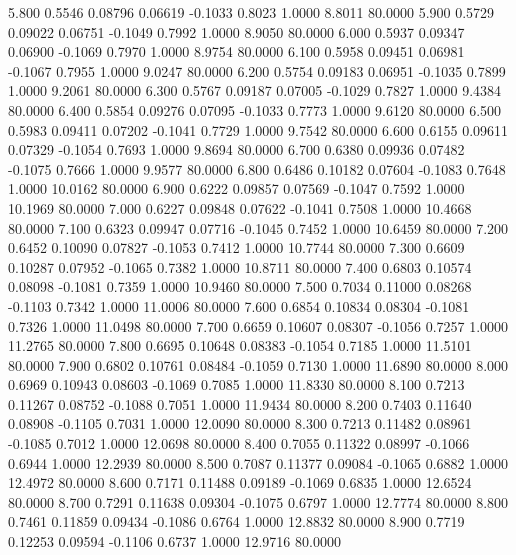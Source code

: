    5.800   0.5546   0.08796   0.06619  -0.1033   0.8023   1.0000   8.8011  80.0000
   5.900   0.5729   0.09022   0.06751  -0.1049   0.7992   1.0000   8.9050  80.0000
   6.000   0.5937   0.09347   0.06900  -0.1069   0.7970   1.0000   8.9754  80.0000
   6.100   0.5958   0.09451   0.06981  -0.1067   0.7955   1.0000   9.0247  80.0000
   6.200   0.5754   0.09183   0.06951  -0.1035   0.7899   1.0000   9.2061  80.0000
   6.300   0.5767   0.09187   0.07005  -0.1029   0.7827   1.0000   9.4384  80.0000
   6.400   0.5854   0.09276   0.07095  -0.1033   0.7773   1.0000   9.6120  80.0000
   6.500   0.5983   0.09411   0.07202  -0.1041   0.7729   1.0000   9.7542  80.0000
   6.600   0.6155   0.09611   0.07329  -0.1054   0.7693   1.0000   9.8694  80.0000
   6.700   0.6380   0.09936   0.07482  -0.1075   0.7666   1.0000   9.9577  80.0000
   6.800   0.6486   0.10182   0.07604  -0.1083   0.7648   1.0000  10.0162  80.0000
   6.900   0.6222   0.09857   0.07569  -0.1047   0.7592   1.0000  10.1969  80.0000
   7.000   0.6227   0.09848   0.07622  -0.1041   0.7508   1.0000  10.4668  80.0000
   7.100   0.6323   0.09947   0.07716  -0.1045   0.7452   1.0000  10.6459  80.0000
   7.200   0.6452   0.10090   0.07827  -0.1053   0.7412   1.0000  10.7744  80.0000
   7.300   0.6609   0.10287   0.07952  -0.1065   0.7382   1.0000  10.8711  80.0000
   7.400   0.6803   0.10574   0.08098  -0.1081   0.7359   1.0000  10.9460  80.0000
   7.500   0.7034   0.11000   0.08268  -0.1103   0.7342   1.0000  11.0006  80.0000
   7.600   0.6854   0.10834   0.08304  -0.1081   0.7326   1.0000  11.0498  80.0000
   7.700   0.6659   0.10607   0.08307  -0.1056   0.7257   1.0000  11.2765  80.0000
   7.800   0.6695   0.10648   0.08383  -0.1054   0.7185   1.0000  11.5101  80.0000
   7.900   0.6802   0.10761   0.08484  -0.1059   0.7130   1.0000  11.6890  80.0000
   8.000   0.6969   0.10943   0.08603  -0.1069   0.7085   1.0000  11.8330  80.0000
   8.100   0.7213   0.11267   0.08752  -0.1088   0.7051   1.0000  11.9434  80.0000
   8.200   0.7403   0.11640   0.08908  -0.1105   0.7031   1.0000  12.0090  80.0000
   8.300   0.7213   0.11482   0.08961  -0.1085   0.7012   1.0000  12.0698  80.0000
   8.400   0.7055   0.11322   0.08997  -0.1066   0.6944   1.0000  12.2939  80.0000
   8.500   0.7087   0.11377   0.09084  -0.1065   0.6882   1.0000  12.4972  80.0000
   8.600   0.7171   0.11488   0.09189  -0.1069   0.6835   1.0000  12.6524  80.0000
   8.700   0.7291   0.11638   0.09304  -0.1075   0.6797   1.0000  12.7774  80.0000
   8.800   0.7461   0.11859   0.09434  -0.1086   0.6764   1.0000  12.8832  80.0000
   8.900   0.7719   0.12253   0.09594  -0.1106   0.6737   1.0000  12.9716  80.0000
